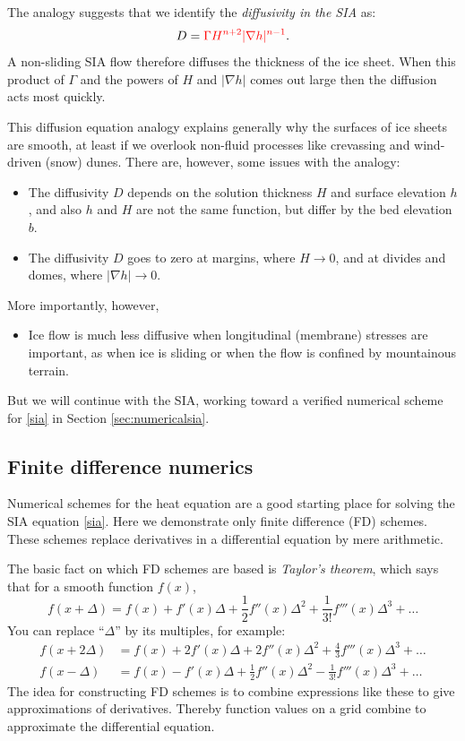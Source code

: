 \documentclass[letterpaper,final,12pt,reqno]{amsart}
\newcommand{\grad}{\nabla}
\begin{document}
The analogy suggests that we identify the \emph{diffusivity in the SIA} as:
	$$D = {\color{red}\Gamma H^{n+2} |\grad h|^{n-1}}.$$
A non-sliding SIA flow therefore diffuses the thickness of the ice sheet.  When this product of $\Gamma$ and the powers of $H$ and $|\grad h|$ comes out large then the diffusion acts most quickly.

This diffusion equation analogy explains generally why the surfaces of ice sheets are smooth, at least if we overlook non-fluid processes like crevassing and wind-driven (snow) dunes.  There are, however, some issues with the analogy:
\begin{itemize}
\item The diffusivity $D$ depends on the solution thickness $H$ and surface elevation $h$, and also $h$ and $H$ are not the same function, but differ by the bed elevation $b$.
\item The diffusivity $D$ goes to zero at margins, where $H\to 0$, and at divides and domes, where $|\grad h|\to 0$.
\end{itemize}
More importantly, however,
\begin{itemize}
\item Ice flow is much less diffusive when longitudinal (membrane) stresses are important, as when ice is sliding or when the flow is confined by mountainous terrain.
\end{itemize}
But we will continue with the SIA, working toward a verified numerical scheme for \eqref{sia} in Section \ref{sec:numericalsia}.

\subsection{Finite difference numerics} 

Numerical schemes for the heat equation are a good starting place for solving the SIA equation \eqref{sia}.  Here we demonstrate only finite difference (FD) schemes.  These schemes replace derivatives in a differential equation by mere arithmetic.

The basic fact on which FD schemes are based is \emph{Taylor's theorem}, which says that for a smooth function $f(x)$,
	$$f(x+\Delta) = f(x) + f'(x) \Delta + \frac{1}{2} f''(x) \Delta^2 + \frac{1}{3!} f'''(x) \Delta^3 + \dots$$
You can replace ``$\Delta$'' by its multiples, for example:
\begin{align*}
f(x+2\Delta) &= f(x) + 2 f'(x) \Delta + 2 f''(x) \Delta^2 + \frac{4}{3} f'''(x) \Delta^3 + \dots \\
f(x-\Delta) &= f(x) - f'(x) \Delta + \frac{1}{2} f''(x) \Delta^2 - \frac{1}{3!} f'''(x) \Delta^3 + \dots
\end{align*}
The idea for constructing FD schemes is to combine expressions like these to give approximations of derivatives.  Thereby function values on a grid combine to approximate the differential equation.
\end{document}
